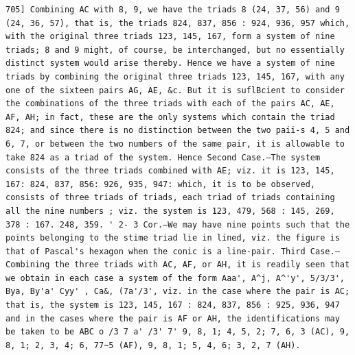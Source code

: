 \documentclass[12pt]{article}
\theoremstyle{plain}
\begin{document}
\newpage
\setcounter{page}{573}
\begin{verbatim}
705] Combining AC with 8, 9, we have the triads 8 (24, 37, 56) and 9 (24, 36, 57), that is, the triads 824, 837, 856 : 924, 936, 957 which, with the original three triads 123, 145, 167, form a system of nine triads; 8 and 9 might, of course, be interchanged, but no essentially distinct system would arise thereby. Hence we have a system of nine triads by combining the original three triads 123, 145, 167, with any one of the sixteen pairs AG, AE, &c. But it is suflBcient to consider the combinations of the three triads with each of the pairs AC, AE, AF, AH; in fact, these are the only systems which contain the triad 824; and since there is no distinction between the two paii-s 4, 5 and 6, 7, or between the two numbers of the same pair, it is allowable to take 824 as a triad of the system. Hence Second Case.—The system consists of the three triads combined with AE; viz. it is 123, 145, 167: 824, 837, 856: 926, 935, 947: which, it is to be observed, consists of three triads of triads, each triad of triads containing all the nine numbers ; viz. the system is 123, 479, 568 : 145, 269, 378 : 167. 248, 359. ' 2- 3 Cor.—We may have nine points such that the points belonging to the stime triad lie in lined, viz. the figure is that of Pascal's hexagon when the conic is a line-pair. Third Case.—Combining the three triads with AC, AF, or AH, it is readily seen that we obtain in each case a system of the form Aaa', A^j, A^'y', 5/3/3', Bya, By'a' Cyy' , Ca&, (7a'/3', viz. in the case where the pair is AC; that is, the system is 123, 145, 167 : 824, 837, 856 : 925, 936, 947 and in the cases where the pair is AF or AH, the identifications may be taken to be ABC o /3 7 a' /3' 7' 9, 8, 1; 4, 5, 2; 7, 6, 3 (AC), 9, 8, 1; 2, 3, 4; 6, 77~5 (AF), 9, 8, 1; 5, 4, 6; 3, 2, 7 (AH). 
\end{verbatim}
\end{document}
